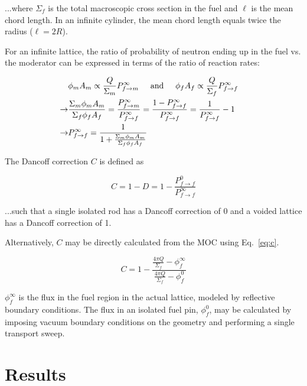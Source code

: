 \documentclass[12pt]{article}
\begin{document}
...where $\Sigma_f$ is the total macroscopic cross section in the fuel and $\ell$ is the mean chord length. In an infinite cylinder, the mean chord length equals twice the radius ($\ell = 2 R$).

For an infinite lattice, the ratio of probability of neutron ending up in the fuel vs. the moderator can be expressed in terms of the ratio of reaction rates:


\begin{align}\label{eq:rxrates}&
\phi_m A_m \propto \frac{Q}{\Sigma_m} P_{f \rightarrow m}^\infty
\hspace{0.5cm} \text{and} \hspace{0.5cm}
\phi_f A_f \propto \frac{Q}{\Sigma_f} P_{f \rightarrow f}^\infty
\cr \rightarrow &
\frac{\Sigma_m \phi_m A_m}{\Sigma_f \phi_f A_f} = 
\frac{P_{f \rightarrow m}^\infty}{P_{f \rightarrow f}^\infty} = 
\frac{1 - P_{f \rightarrow f}^\infty}{P_{f \rightarrow f}^\infty} = 
\frac{1}{P_{f \rightarrow f}^\infty} - 1
\cr \rightarrow & 
P_{f \rightarrow f}^\infty = \frac{1}{1 + 
\frac{\Sigma_m \phi_m A_m}{\Sigma_f \phi_f A_f} }
\end{align}

The Dancoff correction $C$ is defined as

\begin{equation}\label{eq:d}
C = 1 - D = 1 - \frac{P_{f \rightarrow f}^0}{P_{f \rightarrow f}^\infty}
\end{equation}

...such that a single isolated rod has a Dancoff correction of 0 and a voided lattice has a Dancoff correction of 1.

Alternatively, $C$ may be directly calculated from the MOC using Eq.~\ref{eq:c}.

\begin{equation}\label{eq:c}
C = 1 - \frac{\frac{4\pi Q}{\Sigma_f} - \phi_f^\infty}{\frac{4\pi Q}{\Sigma_f} - \phi_f^0}
\end{equation}

$\phi_f^\infty$ is the flux in the fuel region in the actual lattice, modeled by reflective boundary conditions. The flux in an isolated fuel pin, $\phi_f^0$, may be calculated by imposing vacuum boundary conditions on the geometry and performing a single transport sweep.


\newpage
\section{Results}\label{sec:results}
\end{document}
